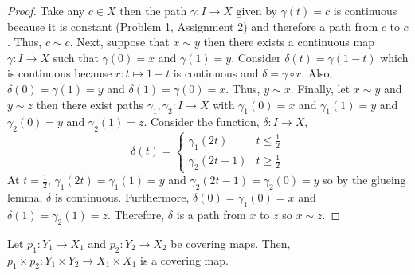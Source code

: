 \documentclass[12pt]{extarticle}
\theoremstyle{remark}
\begin{document}
\begin{proof}
Take any $c \in X$ then the path $\gamma : I \to X$ given by $\gamma(t) = c$ is continuous because it is constant (Problem 1, Assignment 2) and therefore a path from $c$ to $c$. Thus, $c \sim c$. Next, suppose that $x \sim y$ then there exists a continuous map $\gamma : I \to X$ such that $\gamma(0) = x$ and $\gamma(1) = y$. Consider $\delta(t) = \gamma(1 - t)$ which is continuous because $r: t \mapsto 1 - t$ is continuous and $\delta = \gamma \circ r$. Also, $\delta(0) = \gamma(1) = y$ and $\delta(1) = \gamma(0) = x$. Thus, $y \sim x$. Finally, let $x \sim y$ and $y \sim z$ then there exist paths $\gamma_1, \gamma_2 : I \to X$ with $\gamma_1(0) = x$ and $\gamma_1(1) = y$ and $\gamma_2(0) = y$ and $\gamma_2(1) = z$. Consider the function, $\delta : I \to X$,
\[\delta(t) = 
\begin{cases}
\gamma_1(2t) & t \le \frac{1}{2} \\
\gamma_2(2t - 1) & t \ge \frac{1}{2} 
\end{cases}
\]
At $t = \frac{1}{2}$, $\gamma_1(2t) = \gamma_1(1) = y$ and $\gamma_2(2t - 1) = \gamma_2(0) = y$ so by the glueing lemma, $\delta$ is continuous. Furthermore, $\delta(0) = \gamma_1(0) = x$ and $\delta(1) = \gamma_2(1) = z$. Therefore, $\delta$ is a path from $x$ to $z$ so $x \sim z$. 
    
\end{proof}

\begin{lemma} \label{prods}
Let $p_1 : Y_1 \to X_1$ and $p_2 : Y_2 \to X_2$ be covering maps. Then, $p_1 \times p_2 : Y_1 \times Y_2 \to X_1 \times X_1$ is a covering map.
\end{lemma}
\end{document}
